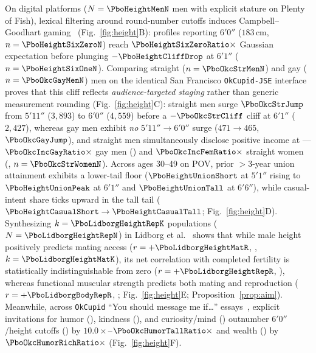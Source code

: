 On digital platforms ($N=\PboHeightMenN$ men with explicit stature on Plenty of Fish), lexical filtering around round-number cutoffs induces Campbell--Goodhart gaming~\cite{campbell1979} (Fig.~\ref{fig:height}B): profiles reporting $6'0''$ ($183\,\mathrm{cm}$, $n=\PboHeightSixZeroN$) reach $\PboHeightSixZeroRatio\times$ Gaussian expectation before plunging $-\PboHeightCliffDrop$ at $6'1''$ ($n=\PboHeightSixOneN$). Comparing straight ($n=\PboOkcStrMenN$) and gay ($n=\PboOkcGayMenN$) men on the identical San Francisco \texttt{OkCupid-JSE} interface~\cite{kim2015} proves that this cliff reflects \emph{audience-targeted staging} rather than generic measurement rounding (Fig.~\ref{fig:height}C): straight men surge $\PboOkcStrJump$ from $5'11''$ ($3{,}893$) to $6'0''$ ($4{,}559$) before a $-\PboOkcStrCliff$ cliff at $6'1''$ ($2{,}427$), whereas gay men exhibit \emph{no} $5'11''\to 6'0''$ surge ($471\to 465$, $\PboOkcGayJump$), and straight men simultaneously disclose positive income at \PboOkcIncStrM{}---$\PboOkcIncGayRatio\times$ gay men (\PboOkcIncGayM{}) and $\PboOkcIncFemRatio\times$ straight women (\PboOkcIncStrW{}, $n=\PboOkcStrWomenN$). Across ages 30--49 on POV, prior $>3$-year union attainment exhibits a lower-tail floor ($\PboHeightUnionShort$ at $5'1''$ rising to $\PboHeightUnionPeak$ at $6'1''$ and $\PboHeightUnionTall$ at $6'6''$), while casual-intent share ticks upward in the tall tail ($\PboHeightCasualShort\to\PboHeightCasualTall$; Fig.~\ref{fig:height}D). Synthesizing $k=\PboLidborgHeightRepK$ populations ($N=\PboLidborgHeightRepN$) in Lidborg et al.~\cite{lidborg2022} shows that while male height positively predicts mating access ($r=+\PboLidborgHeightMatR$, \PboLidborgHeightMatCI, $k=\PboLidborgHeightMatK$), its net correlation with completed fertility is statistically indistinguishable from zero ($r=+\PboLidborgHeightRepR$, \PboLidborgHeightRepCI), whereas functional muscular strength predicts both mating and reproduction ($r=+\PboLidborgBodyRepR$, \PboLidborgBodyRepCI; Fig.~\ref{fig:height}E; Proposition~\ref{prop:aim}). Meanwhile, across \PboOkcMsgN{} \texttt{OkCupid} ``You should message me if\dots'' essays~\cite{kim2015}, explicit invitations for humor (\PboOkcMsgHumor{}), kindness (\PboOkcMsgKind{}), and curiosity/mind (\PboOkcMsgMind{}) outnumber $6'0''$/height cutoffs (\PboOkcMsgTall{}) by $10.0\times$--$\PboOkcHumorTallRatio\times$ and wealth (\PboOkcMsgRich{}) by $\PboOkcHumorRichRatio\times$ (Fig.~\ref{fig:height}F).

